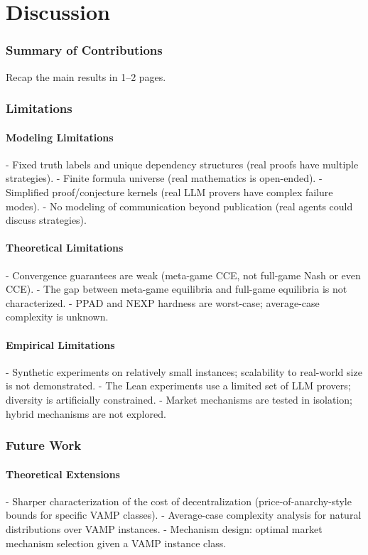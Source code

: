 \chapter{Discussion}\label{chap:discussion}

\subsection{Summary of Contributions}
Recap the main results in 1--2 pages.

\subsection{Limitations}

\subsubsection{Modeling Limitations}
- Fixed truth labels and unique dependency structures (real proofs have multiple strategies).
- Finite formula universe (real mathematics is open-ended).
- Simplified proof/conjecture kernels (real LLM provers have complex failure modes).
- No modeling of communication beyond publication (real agents could discuss strategies).

\subsubsection{Theoretical Limitations}
- Convergence guarantees are weak (meta-game CCE, not full-game Nash or even CCE).
- The gap between meta-game equilibria and full-game equilibria is not characterized.
- PPAD and NEXP hardness are worst-case; average-case complexity is unknown.

\subsubsection{Empirical Limitations}
- Synthetic experiments on relatively small instances; scalability to real-world size is not demonstrated.
- The Lean experiments use a limited set of LLM provers; diversity is artificially constrained.
- Market mechanisms are tested in isolation; hybrid mechanisms are not explored.

\subsection{Future Work}

\subsubsection{Theoretical Extensions}
- Sharper characterization of the cost of decentralization (price-of-anarchy-style bounds for specific VAMP classes).
- Average-case complexity analysis for natural distributions over VAMP instances.
- Mechanism design: optimal market mechanism selection given a VAMP instance class.

